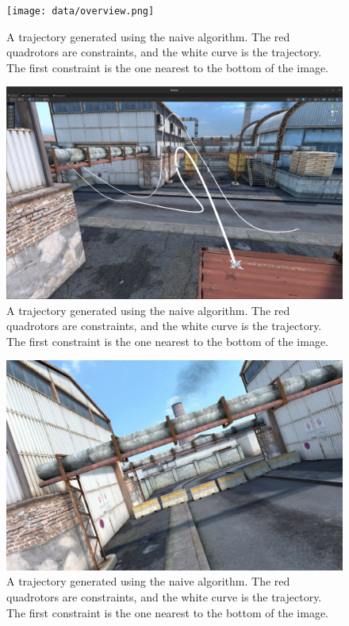 \documentclass[pageno]{jpaper}
\begin{document}
\begin{figure}[hbt]
  \texttt{[image: data/overview.png]}
  \caption{A trajectory generated using the naive algorithm. The red quadrotors are constraints, and the white curve is the trajectory. The first constraint is the one nearest to the bottom of the image.}
  \label{fig:overview}
\end{figure}

\begin{figure}[hbt]
  \includegraphics[width=\linewidth]{data/landing.png}
  \caption{A trajectory generated using the naive algorithm. The red quadrotors are constraints, and the white curve is the trajectory. The first constraint is the one nearest to the bottom of the image.}
  \label{fig:landing}
\end{figure}

\begin{figure}[hbt]
  \includegraphics[width=\linewidth]{data/onboard.png}
  \caption{A trajectory generated using the naive algorithm. The red quadrotors are constraints, and the white curve is the trajectory. The first constraint is the one nearest to the bottom of the image.}
  \label{fig:onboard}
\end{figure}
\end{document}
